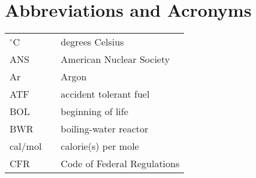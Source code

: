 \chapter*{Abbreviations and Acronyms}
\noindent
\begin{ThreePartTable}
    \begin{longtable}{l l l}
        
        $^{\circ}$C                 &      \hspace{0.25in}     &         degrees Celsius                                    \\
                                                                                                                               
        ANS                         &      \hspace{0.25in}     &         American Nuclear Society                           \\
        
        Ar                          &      \hspace{0.25in}     &         Argon                                              \\
        
        ATF                         &      \hspace{0.25in}     &         accident tolerant fuel                             \\
        
        BOL                         &      \hspace{0.25in}     &         beginning of life                                  \\
        
        BWR                         &      \hspace{0.25in}     &         boiling-water reactor                              \\
        
        cal/mol                     &      \hspace{0.25in}     &         calorie(s) per mole                                \\
        
        CFR                         &      \hspace{0.25in}     &         Code of Federal Regulations                        \\
        

\end{longtable}
\end{ThreePartTable}
